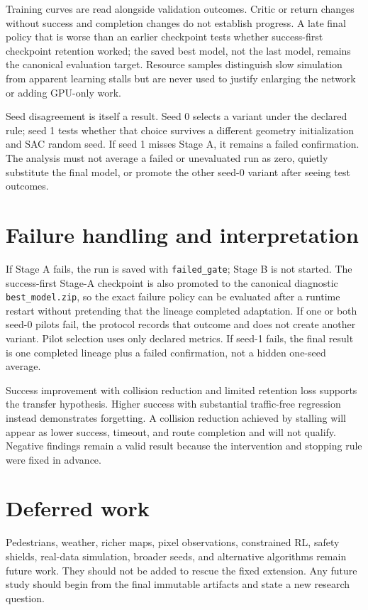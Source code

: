 \documentclass[10pt,twocolumn]{article}
\begin{document}
Training curves are read alongside validation outcomes. Critic or return changes without
success and completion changes do not establish progress. A late final policy that is
worse than an earlier checkpoint tests whether success-first checkpoint retention worked;
the saved best model, not the last model, remains the canonical evaluation target.
Resource samples distinguish slow simulation from apparent learning stalls but are never
used to justify enlarging the network or adding GPU-only work.

Seed disagreement is itself a result. Seed 0 selects a variant under the declared rule;
seed 1 tests whether that choice survives a different geometry initialization and SAC
random seed. If seed 1 misses Stage A, it remains a failed confirmation. The analysis
must not average a failed or unevaluated run as zero, quietly substitute the final model,
or promote the other seed-0 variant after seeing test outcomes.

\section{Failure handling and interpretation}
If Stage A fails, the run is saved with \texttt{failed\_gate}; Stage B is not started.
The success-first Stage-A checkpoint is also promoted to the canonical diagnostic
\texttt{best\_model.zip}, so the exact failure policy can be evaluated after a runtime
restart without pretending that the lineage completed adaptation.
If one or both seed-0 pilots fail, the protocol records that outcome and does not create
another variant. Pilot selection uses only declared metrics. If seed-1 fails, the final
result is one completed lineage plus a failed confirmation, not a hidden one-seed average.

Success improvement with collision reduction and limited retention loss supports the
transfer hypothesis. Higher success with substantial traffic-free regression instead
demonstrates forgetting. A collision reduction achieved by stalling will appear as lower
success, timeout, and route completion and will not qualify. Negative findings remain a
valid result because the intervention and stopping rule were fixed in advance.

\section{Deferred work}
Pedestrians, weather, richer maps, pixel observations, constrained RL, safety shields,
real-data simulation, broader seeds, and alternative algorithms remain future work.
They should not be added to rescue the fixed extension. Any future study should begin
from the final immutable artifacts and state a new research question.



\end{document}

